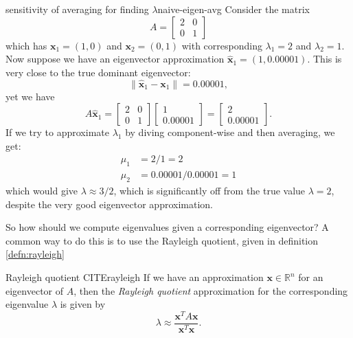 \documentclass{article}
\let\vec\mathbf
\begin{document}
\begin{example}{sensitivity of averaging for finding $\lambda$}{naive-eigen-avg}
  Consider the matrix
  \begin{equation*}
    A = \begin{bmatrix}2 & 0 \\ 0 & 1\end{bmatrix}
  \end{equation*}
  which has $\vec{x}_1 = (1,0)$ and $\vec{x}_2 = (0,1)$ with corresponding $\lambda_1 = 2$ and $\lambda_2 = 1$. Now suppose we have an eigenvector approximation $\hat{\vec{x}}_1 = (1, 0.00001)$. This is very close to the true dominant eigenvector:
  \begin{equation*}
    \lVert \hat{\vec{x}}_1 - \vec{x}_1 \rVert = 0.00001,
  \end{equation*}
  yet we have
  \begin{equation*}
    A\hat{\vec{x}}_1 = \begin{bmatrix}2 & 0 \\ 0 & 1\end{bmatrix}\begin{bmatrix}1 \\ 0.00001\end{bmatrix} = \begin{bmatrix}2 \\ 0.00001\end{bmatrix}.
  \end{equation*}
  If we try to approximate $\lambda_1$ by diving component-wise and then averaging, we get:
  \begin{align*}
    \mu_1 &= 2 / 1 = 2 \\
    \mu_2 &= 0.00001 / 0.00001 = 1
  \end{align*}
  which would give $\lambda \approx 3/2$, which is significantly off from the true value $\lambda = 2$, despite the very good eigenvector approximation.
\end{example}

So how should we compute eigenvalues given a corresponding eigenvector? A common way to do this is to use the Rayleigh quotient, given in definition \ref{defn:rayleigh}

\begin{definition}{Rayleigh quotient CITE}{rayleigh}
  If we have an approximation $\vec{x} \in \mathbb{R}^n$ for an eigenvector of $A$, then the \textit{Rayleigh quotient} approximation for the corresponding eigenvalue $\lambda$ is given by
  \begin{equation*}
    \lambda \approx \frac{\vec{x}^TA\vec{x}}{\vec{x}^T\vec{x}}.
  \end{equation*}
\end{definition}
\end{document}
